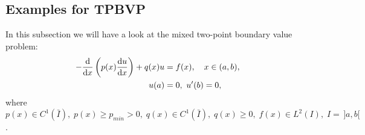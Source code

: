 \begin{figure}[!htbp]
	\end{figure}

	\subsection{Examples for TPBVP}\label{subsection.5.3}
	In this subsection we will have a look at the mixed two-point boundary
	value problem:
	\begin{align*}
		-\frac{\mathrm{d}}{\mathrm{d} x}\left(p(x)\frac{\mathrm{d} u}{\mathrm{d} x}\right)+q(x)u&=f(x),
		\quad x\in (a,b),\\
		u(a) &= 0,\ u'(b) = 0,
	\end{align*}
	where $p(x) \in C^1(\bar{I}),\; p(x)\geq p_{min}>0,\; 
	q(x) \in  C^1(\bar{I}),\; q(x)\geq 0,\; f(x) \in L^2(I),\;
	I =\,]a,b[ $.
	
